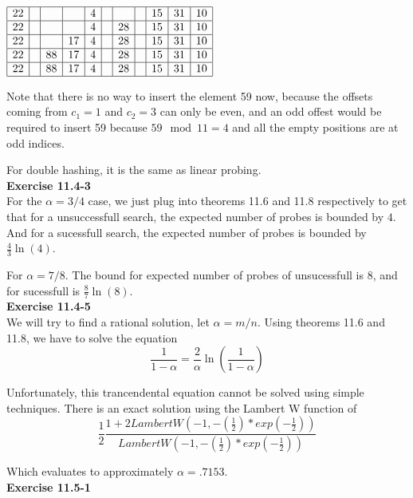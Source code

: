 \documentclass{article}
\begin{document}
$
\begin{array}{|c|c|c|c|c|c|c|c|c|c|c|}
\hline
22&&&&4&&&&15&31&10\\
\hline
22&&&&4&&28&&15&31&10\\
\hline
22&&&17&4&&28&&15&31&10\\
\hline
22&&88&17&4&&28&&15&31&10\\
\hline
22&&88&17&4&&28&&15&31&10\\
\hline
\end{array}
$ 

Note that there is no way to insert the element 59 now, because the offsets coming from $c_1 =1$ and $c_2 =3$ can only be even, and an odd offest would be required to insert 59 because $59 \mod 11 = 4$ and all the empty positions are at odd indices.

For double hashing, it is the same as linear probing. \\

\noindent\textbf{ Exercise 11.4-3} \\
For the $\alpha = 3/4$ case, we just plug into theorems 11.6 and 11.8 respectively to get that for a unsuccessfull search, the expected number of probes is bounded by $4$. And for a sucessfull search, the expected number of probes is bounded by $\frac{4}{3}\ln(4)$.

For $\alpha = 7/8$. The bound for expected number of probes of unsucessfull is $8$, and for sucessfull is $\frac{8}{7}\ln(8)$.\\

\noindent\textbf{ Exercise 11.4-5} \\
We will try to find a rational solution, let $\alpha = m/n$. Using theorems 11.6 and 11.8, we have to solve the equation 
\[
\frac{1}{1-\alpha} = \frac{2}{\alpha}\ln(\frac{1}{1-\alpha}) 
\]

Unfortunately, this trancendental equation cannot be solved using simple techniques. There is an exact solution using the Lambert W function of 
\[
\frac{1}{2}\frac{1+2LambertW(-1, -(\frac{1}{2})*exp(-\frac{1}{2}))}{LambertW(-1, -(\frac{1}{2})*exp(-\frac{1}{2})) }
\]

Which evaluates to approximately $\alpha = .7153$.\\

\noindent\textbf{ Exercise 11.5-1} \\
\end{document}
